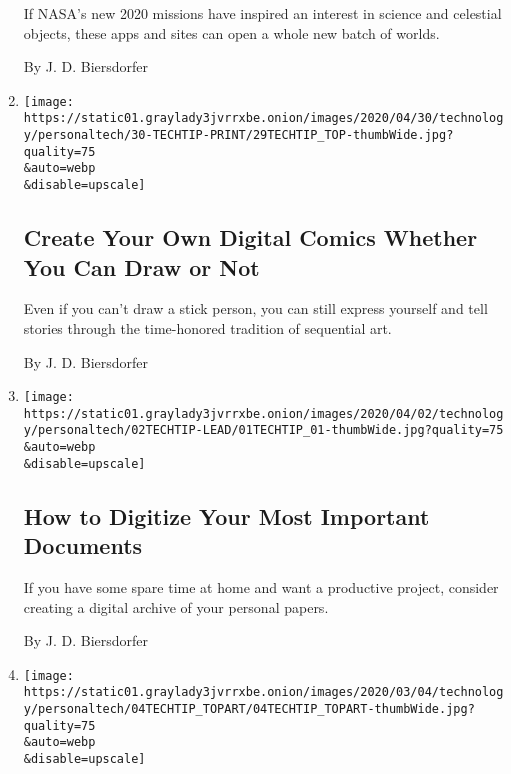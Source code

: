 \begin{enumerate}
  If NASA's new 2020 missions have inspired an interest in science and
  celestial objects, these apps and sites can open a whole new batch of
  worlds.

  By J. D. Biersdorfer
\item
  \href{/2020/04/29/technology/personaltech/create-your-own-digital-comics-whether-you-can-draw-or-not.html}{}

  \texttt{[image: https://static01.graylady3jvrrxbe.onion/images/2020/04/30/technology/personaltech/30-TECHTIP-PRINT/29TECHTIP\_TOP-thumbWide.jpg?quality=75\\\&auto=webp\\\&disable=upscale]}

  \hypertarget{create-your-own-digital-comics-whether-you-can-draw-or-not}{%
  \subsection{Create Your Own Digital Comics Whether You Can Draw or
  Not}\label{create-your-own-digital-comics-whether-you-can-draw-or-not}}

  Even if you can't draw a stick person, you can still express yourself
  and tell stories through the time-honored tradition of sequential art.

  By J. D. Biersdorfer
\item
  \href{/2020/04/01/technology/personaltech/digitizing-important-documents.html}{}

  \texttt{[image: https://static01.graylady3jvrrxbe.onion/images/2020/04/02/technology/personaltech/02TECHTIP-LEAD/01TECHTIP\_01-thumbWide.jpg?quality=75\\\&auto=webp\\\&disable=upscale]}

  \hypertarget{how-to-digitize-your-most-important-documents}{%
  \subsection{How to Digitize Your Most Important
  Documents}\label{how-to-digitize-your-most-important-documents}}

  If you have some spare time at home and want a productive project,
  consider creating a digital archive of your personal papers.

  By J. D. Biersdorfer
\item
  \href{/2020/03/04/technology/personaltech/iphone-pixel-camera-tips.html}{}

  \texttt{[image: https://static01.graylady3jvrrxbe.onion/images/2020/03/04/technology/personaltech/04TECHTIP\_TOPART/04TECHTIP\_TOPART-thumbWide.jpg?quality=75\\\&auto=webp\\\&disable=upscale]}


\end{enumerate}
